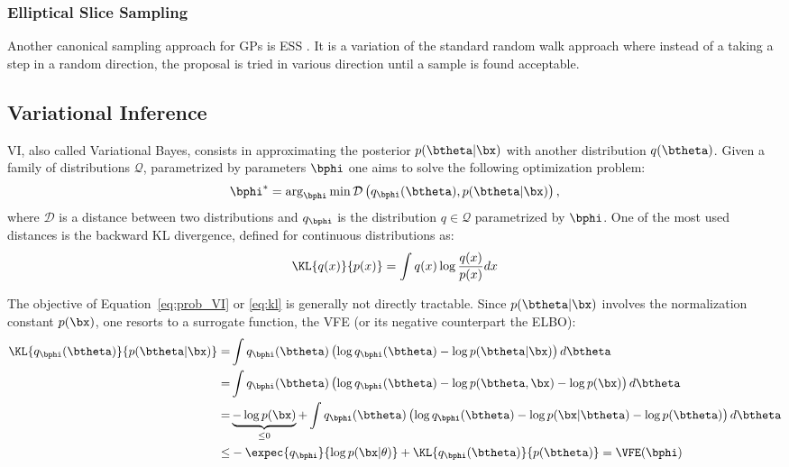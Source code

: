 \subsubsection{Elliptical Slice Sampling}

Another canonical sampling approach for \ac{GPs} is \ac{ESS} \citet{murrayEllipticalSliceSampling2010}.
It is a variation of the standard random walk approach where instead of a taking a step in a random direction, the proposal is tried in various direction until a sample is found acceptable.



\subsection{Variational Inference}

\acf{VI}, also called Variational Bayes, consists in approximating the posterior $p(\btheta|\bx)$ with another distribution $q(\btheta)$.
Given a family of distributions $\mathcal{Q}$, parametrized by parameters $\bphi$ one aims to solve the following optimization problem:
\begin{align}
\bphi^* = \arg_{\bphi}\min \mathcal{D}\left(q_{\bphi}(\btheta), p(\btheta|\bx)\right),
\label{eq:prob_VI}
\end{align}
where $\mathcal{D}$ is a distance between two distributions and $q_{\bphi}$ is the distribution $q\in \mathcal{Q}$ parametrized by $\bphi$.
One of the most used distances is the backward \ac{KL} divergence, defined for continuous distributions as:
\begin{align}
\KL{q(x)}{p(x)} = \int q(x) \log \frac{q(x)}{p(x)}dx
\label{eq:kl}
\end{align}

The objective of Equation~\eqref{eq:prob_VI} or \eqref{eq:kl} is generally not directly tractable.
Since $p(\btheta|\bx)$ involves the normalization constant $p(\bx)$, one resorts to a surrogate function, the \ac{VFE} (or its negative counterpart the \ac{ELBO}):
\begin{align}
\KL{q_{\bphi}(\btheta)}{p(\btheta|\bx)} =& \int q_{\bphi}(\btheta) \left(\log q_{\bphi}(\btheta) - \log p(\btheta|\bx)\right)d\btheta\\
=&\int q_{\bphi}(\btheta) \left(\log q_{\bphi}(\btheta) - \log p(\btheta, \bx) - \log p(\bx)\right)d\btheta\\
=&\underbrace{- \log p(\bx)}_{\leq 0} + \int q_{\bphi}(\btheta) \left(\log q_{\bphi}(\btheta) - \log p(\bx|\btheta)- \log p(\btheta) \right)d\btheta\\
\leq& -\expec{q_{\bphi}}{\log p(\bx|\theta)} + \KL{q_{\bphi}(\btheta)}{p(\btheta)} = \VFE(\bphi)
\end{align}


